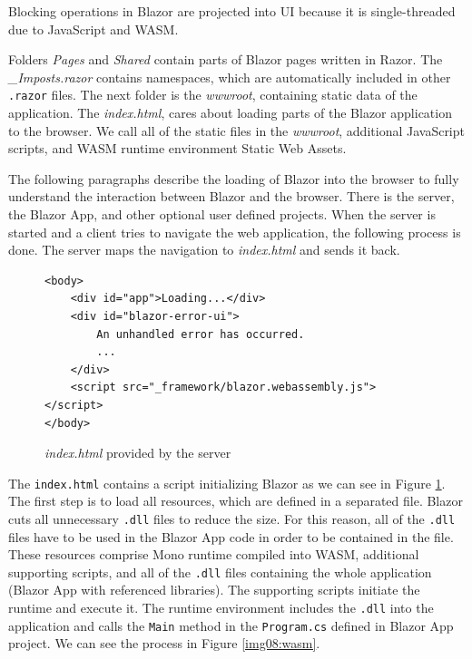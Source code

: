 Blocking operations in Blazor are projected into UI because it is single-threaded due to JavaScript and WASM.
\par
Folders \textit{Pages} and \textit{Shared} contain parts of Blazor pages written in Razor.
The \textit{\_Imposts.razor} contains namespaces, which are automatically included in other \texttt{.razor} files.
The next folder is the \textit{wwwroot}, containing static data of the application.
The \textit{index.html}, cares about loading parts of the Blazor application to the browser.
We call all of the static files in the \textit{wwwroot}, additional JavaScript scripts, and WASM runtime environment Static Web Assets.
\par
The following paragraphs describe the loading of Blazor into the browser to fully understand the interaction between Blazor and the browser.
There is the server, the Blazor App, and other optional user defined projects. 
When the server is started and a client tries to navigate the web application, the following process is done.
The server maps the navigation to \textit{index.html} and sends it back.
\par
\begin{figure}[b!]
\begin{lstlisting}
<body>
    <div id="app">Loading...</div>
    <div id="blazor-error-ui">
        An unhandled error has occurred.
		...
    </div>
    <script src="_framework/blazor.webassembly.js"></script>
</body>

\end{lstlisting}
\caption{\textit{index.html} provided by the server}
\label{img07:index}
\end{figure}
\par 
The \texttt{index.html} contains a script initializing Blazor as we can see in Figure \ref{img07:index}.
The first step is to load all resources, which are defined in a separated file.
Blazor cuts all unnecessary \texttt{.dll} files to reduce the size.
For this reason, all of the \texttt{.dll} files have to be used in the Blazor App code in order to be contained in the file. 
These resources comprise Mono runtime compiled into WASM, additional supporting scripts, and all of the \texttt{.dll} files containing the whole application (Blazor App with referenced libraries).
The supporting scripts initiate the runtime and execute it.
The runtime environment includes the \texttt{.dll} into the application and calls the \texttt{Main} method in the \texttt{Program.cs} defined in Blazor App project.
We can see the process in Figure \ref{img08:wasm}.
